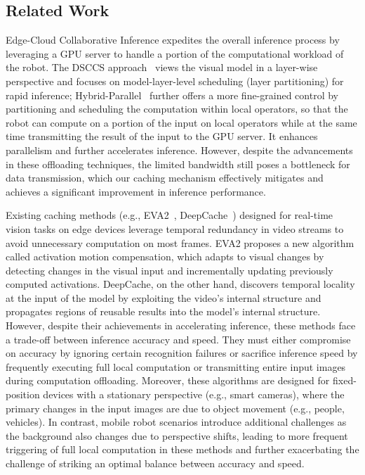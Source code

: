 \subsection{Related Work}
Edge-Cloud Collaborative Inference expedites the overall inference process by leveraging a GPU server to handle a portion of the computational workload of the robot. 
The DSCCS approach~\cite{liang2023dnn} views the visual model in a layer-wise perspective and focuses on model-layer-level scheduling (layer partitioning) for rapid inference;
Hybrid-Parallel~\cite{sun2024hybridparallel} further offers a more fine-grained control by partitioning and scheduling the computation within local operators, so that the robot can compute on a portion of the input on local operators while at the same time transmitting the result of the input to the GPU server.
It enhances parallelism and further accelerates inference. 
However, despite the advancements in these offloading techniques, the limited bandwidth still poses a bottleneck for data transmission, which our caching mechanism effectively mitigates and achieves a significant improvement in inference performance.

Existing caching methods (e.g., EVA2~\cite{cavigelli_cbinfer_2017}, DeepCache~\cite{xu2018deepcache}) designed for real-time vision tasks on edge devices leverage temporal redundancy in video streams to avoid unnecessary computation on most frames. 
EVA2 proposes a new algorithm called activation motion compensation, which adapts to visual changes by detecting changes in the visual input and incrementally updating previously computed activations. 
DeepCache, on the other hand, discovers temporal locality at the input of the model by exploiting the video's internal structure and propagates regions of reusable results into the model's internal structure. 
However, despite their achievements in accelerating inference, these methods face a trade-off between inference accuracy and speed. 
They must either compromise on accuracy by ignoring certain recognition failures or sacrifice inference speed by frequently executing full local computation or transmitting entire input images during computation offloading.
Moreover, these algorithms are designed for fixed-position devices with a stationary perspective (e.g., smart cameras), where the primary changes in the input images are due to object movement (e.g., people, vehicles). 
In contrast, mobile robot scenarios introduce additional challenges as the background also changes due to perspective shifts, leading to more frequent triggering of full local computation in these methods and further exacerbating the challenge of striking an optimal balance between accuracy and speed.

